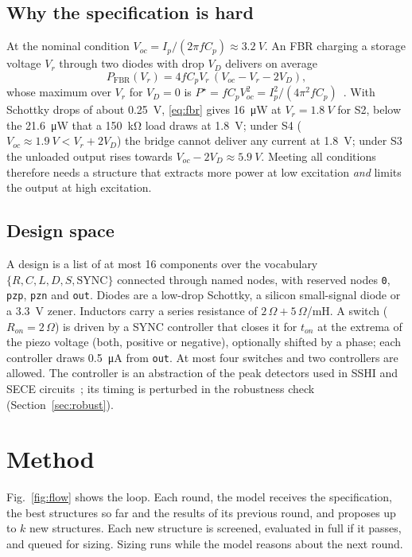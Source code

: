\documentclass[journal]{IEEEtran}
\begin{document}
\subsection{Why the specification is hard}
At the nominal condition $V_{oc} = I_p/(2\pi f C_p) \approx \SI{3.2}{V}$. An FBR charging a storage
voltage $V_r$ through two diodes with drop $V_D$ delivers on average
\begin{equation}\label{eq:fbr}
P_{\mathrm{FBR}}(V_r) = 4 f C_p V_r\,(V_{oc} - V_r - 2V_D),
\end{equation}
whose maximum over $V_r$ for $V_D=0$ is $P^\star = f C_p V_{oc}^2 = I_p^2/(4\pi^2 f C_p)$~\cite{lefeuvre2006comparison}.
With Schottky drops of about \SI{0.25}{V}, \eqref{eq:fbr} gives \SI{16}{\micro W} at $V_r=\SI{1.8}{V}$ for
S2, below the \SI{21.6}{\micro W} that a \SI{150}{\kilo\ohm} load draws at \SI{1.8}{V}; under S4
($V_{oc}\approx\SI{1.9}{V} < V_r + 2V_D$) the bridge cannot deliver any current at \SI{1.8}{V}; under S3 the unloaded output rises
towards $V_{oc}-2V_D\approx\SI{5.9}{V}$. Meeting all conditions therefore needs a structure that extracts
more power at low excitation \emph{and} limits the output at high excitation.

\subsection{Design space}
A design is a list of at most 16 components over the vocabulary $\{R, C, L, D, S, \mathrm{SYNC}\}$
connected through named nodes, with reserved nodes \texttt{0}, \texttt{pzp}, \texttt{pzn} and
\texttt{out}. Diodes are a low-drop Schottky, a silicon small-signal diode or a \SI{3.3}{V} zener.
Inductors carry a series resistance of $2\,\Omega + 5\,\Omega$/mH. A switch ($R_{on}=2\,\Omega$) is driven
by a SYNC controller that closes it for $t_{on}$ at the extrema of the piezo voltage (both, positive or
negative), optionally shifted by a phase; each controller draws \SI{0.5}{\micro A} from \texttt{out}.
At most four switches and two controllers are allowed. The controller is an abstraction of the
peak detectors used in SSHI and SECE circuits~\cite{guyomar2005sshi,ramadass2010biasflip}; its timing
is perturbed in the robustness check (Section~\ref{sec:robust}).

\section{Method}\label{sec:method}
Fig.~\ref{fig:flow} shows the loop. Each round, the model receives the specification, the best
structures so far and the results of its previous round, and proposes up to $k$ new structures. Each
new structure is screened, evaluated in full if it passes, and queued for sizing. Sizing runs while the
model reasons about the next round.
\end{document}
